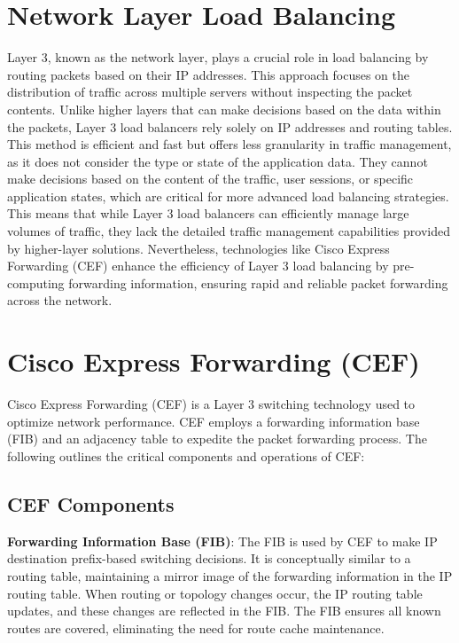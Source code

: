 \documentclass[12pt]{cwru_thesis}
\begin{document}
\section{Network Layer Load Balancing}
Layer 3, known as the network layer, plays a crucial role in load balancing by routing packets based on their IP addresses. This approach focuses on the distribution of traffic across multiple servers without inspecting the packet contents. Unlike higher layers that can make decisions based on the data within the packets, Layer 3 load balancers rely solely on IP addresses and routing tables. This method is efficient and fast but offers less granularity in traffic management, as it does not consider the type or state of the application data. They cannot make decisions based on the content of the traffic, user sessions, or specific application states, which are critical for more advanced load balancing strategies. This means that while Layer 3 load balancers can efficiently manage large volumes of traffic, they lack the detailed traffic management capabilities provided by higher-layer solutions. Nevertheless, technologies like Cisco Express Forwarding (CEF) enhance the efficiency of Layer 3 load balancing by pre-computing forwarding information, ensuring rapid and reliable packet forwarding across the network.

\section{Cisco Express Forwarding (CEF)}

Cisco Express Forwarding (CEF) is a Layer 3 switching technology used to optimize network performance. CEF employs a forwarding information base (FIB) and an adjacency table to expedite the packet forwarding process. The following outlines the critical components and operations of CEF:

\subsection{CEF Components}

\textbf{Forwarding Information Base (FIB)}: The FIB is used by CEF to make IP destination prefix-based switching decisions. It is conceptually similar to a routing table, maintaining a mirror image of the forwarding information in the IP routing table. When routing or topology changes occur, the IP routing table updates, and these changes are reflected in the FIB. The FIB ensures all known routes are covered, eliminating the need for route cache maintenance.
\end{document}
